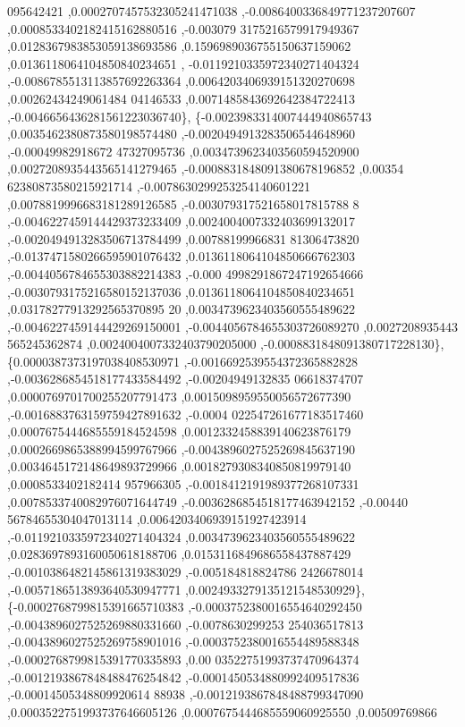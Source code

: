 \begin{DoxyCode}
      095642421 ,0.0002707457532305241471038 ,-0.0086400336849771237207607 ,0.0008533402182415162880516 ,-0.003079
      3175216579917949367 ,0.0128367983853059138693586 ,0.1596989036755150637159062 ,0.0136118064104850840234651 ,
      -0.0119210335972340271404324 ,-0.0086785513113857692263364 ,0.0064203406939151320270698 ,0.00262434249061484
      04146533 ,0.0071485843692642384722413 ,-0.0046656436281561223036740\},
\{-0.0023983314007444940865743 ,0.0035462380873580198574480 ,-0.0020494913283506544648960 ,-0.00049982918672
      47327095736 ,0.0034739623403560594520900 ,0.0027208935443565141279465 ,-0.0008831848091380678196852 ,0.00354
      62380873580215921714 ,-0.0078630299253254140601221 ,0.0078819996683181289126585 ,-0.003079317521658017815788
      8 ,-0.0046227459144429373233409 ,0.0024004007332403699132017 ,-0.0020494913283506713784499 ,0.00788199966831
      81306473820 ,-0.0137471580266595901076432 ,0.0136118064104850666762303 ,-0.0044056784655303882214383 ,-0.000
      4998291867247192654666 ,-0.0030793175216580152137036 ,0.0136118064104850840234651 ,0.03178277913292565370895
      20 ,0.0034739623403560555489622 ,-0.0046227459144429269150001 ,-0.0044056784655303726089270 ,0.0027208935443
      565245362874 ,0.0024004007332403790205000 ,-0.0008831848091380717228130\},
\{0.0000387373197038408530971 ,-0.0016692539554372365882828 ,-0.0036286854518177433584492 ,-0.00204949132835
      06618374707 ,0.0000769701700255207791473 ,0.0015098959550056572677390 ,-0.0016883763159759427891632 ,-0.0004
      022547261677183517460 ,0.0007675444685559184524598 ,0.0012332458839140623876179 ,0.0002669865388994599767966
       ,-0.0043896027525269845637190 ,0.0034645172148649893729966 ,0.0018279308340850819979140 ,0.0008533402182414
      957966305 ,-0.0018412191989377268107331 ,0.0078533740082976071644749 ,-0.0036286854518177463942152 ,-0.00440
      56784655304047013114 ,0.0064203406939151927423914 ,-0.0119210335972340271404324 ,0.0034739623403560555489622
       ,0.0283697893160050618188706 ,0.0153116849686558437887429 ,-0.0010386482145861319383029 ,-0.005184818824786
      2426678014 ,-0.0057186513893640530947771 ,0.0024933279135121548530929\},
\{-0.0002768799815391665710383 ,-0.0003752380016554640292450 ,-0.0043896027525269880331660 ,-0.0078630299253
      254036517813 ,-0.0043896027525269758901016 ,-0.0003752380016554489588348 ,-0.0002768799815391770335893 ,0.00
      03522751993737470964374 ,-0.0012193867848488476254842 ,-0.0001450534880992409517836 ,-0.00014505348809920614
      88938 ,-0.0012193867848488799347090 ,0.0003522751993737646605126 ,0.0007675444685559060925550 ,0.00509769866

\end{DoxyCode}
